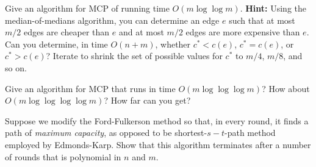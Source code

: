 \documentclass[11pt,a4paper,oneside]{article}
\begin{document}
\begin{problem}{2}
	\statement
	Give an algorithm for MCP of running time $O(m \log \log m)$. \textbf{Hint:} Using the median-of-medians algorithm,
	you can determine an edge $e$ such that at most $m/2$ edges are cheaper than $e$ and at most $m/2$ edges are
	more expensive than $e$. Can you determine, in time $O(n+m)$, whether $c^* < c(e)$, $c^* = c(e)$, or $c^* > c(e)$?
	Iterate to shrink the set of possible
	values for $c^*$ to $m/4$, $m/8$, and so on.

	\solution
	
\end{problem}
\begin{problem}{3}
	\statement
	Give an algorithm for MCP that runs in time $O(m \log \log \log m)$? How about $O(m \log \log \log \log m)$? How far can you get?

\end{problem}

\begin{problem}{4}
\statement
	Suppose we modify the Ford-Fulkerson method so that, in every round, it finds a path of {\em maximum capacity}, as opposed
	to be shortest-$s-t$-path method employed by Edmonds-Karp. Show that this algorithm terminates after a number of rounds that is 
	polynomial in $n$ and $m$.
\solution
\end{problem}
\end{document}
